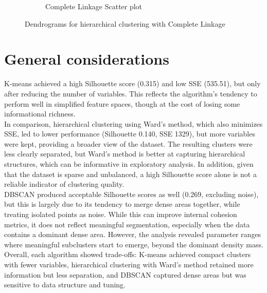 \begin{figure}[H]
\begin{subfigure}[b]{0.49\textwidth}
        \caption{Complete Linkage Scatter plot}
        \label{fig:pairplot_ward_5}
    \end{subfigure}
    \caption{Dendrograms for hierarchical clustering with Complete Linkage}
    \label{fig:dendrograms_complete}
\end{figure}

\section{General considerations}\label{sec:considerations}
K-means achieved a high Silhouette score (0.315) and low SSE (535.51), but only after reducing the number of variables. 
This reflects the algorithm's tendency to perform well in simplified feature spaces, though at the cost of losing some informational richness.\\
In comparison, hierarchical clustering using Ward's method, which also minimizes SSE, 
led to lower performance (Silhouette 0.140, SSE 1329), but more variables were kept,
providing a broader view of the dataset. The resulting clusters were less clearly
separated, but Ward's method is better at capturing hierarchical structures, which can be informative in exploratory analysis. In addition, given that the dataset is sparse and unbalanced, a high 
Silhouette score alone is not a reliable indicator of clustering quality.\\
DBSCAN produced acceptable Silhouette scores as well (0.269, excluding noise), 
but this is largely due to its tendency to merge dense areas together, while treating isolated points as noise. 
While this can improve internal cohesion metrics, it does not reflect meaningful segmentation, especially when the data contains a dominant dense area. 
However, the analysis revealed parameter ranges where meaningful subclusters start to emerge, beyond the dominant density mass.\\
Overall, each algorithm showed trade-offs: K-means achieved compact clusters with fewer variables, 
hierarchical clustering with Ward's method retained more information but less separation, 
and DBSCAN captured dense areas but was sensitive to data structure and tuning.



